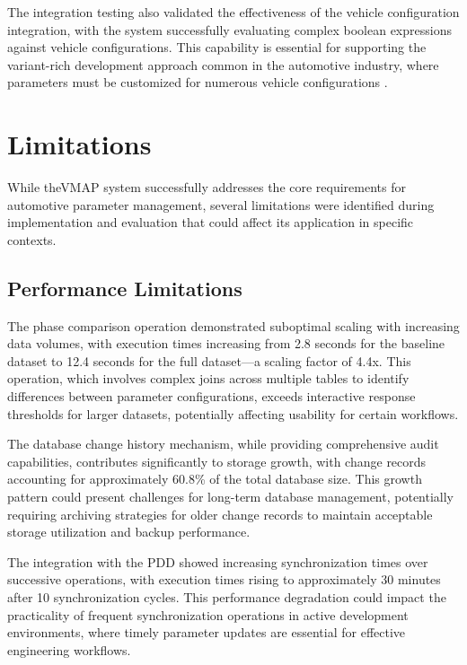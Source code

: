 The integration testing also validated the effectiveness of the vehicle configuration integration, with the system successfully evaluating complex boolean expressions against vehicle configurations. This capability is essential for supporting the variant-rich development approach common in the automotive industry, where parameters must be customized for numerous vehicle configurations \cite{staron2021autosar}.

\section{Limitations}
\label{sec:limitations}

While the\ac{VMAP} system successfully addresses the core requirements for automotive parameter management, several limitations were identified during implementation and evaluation that could affect its application in specific contexts.

\subsection{Performance Limitations}
\label{subsec:performance-limitations}

The phase comparison operation demonstrated suboptimal scaling with increasing data volumes, with execution times increasing from 2.8 seconds for the baseline dataset to 12.4 seconds for the full dataset—a scaling factor of 4.4x. This operation, which involves complex joins across multiple tables to identify differences between parameter configurations, exceeds interactive response thresholds for larger datasets, potentially affecting usability for certain workflows.

The database change history mechanism, while providing comprehensive audit capabilities, contributes significantly to storage growth, with change records accounting for approximately 60.8\% of the total database size. This growth pattern could present challenges for long-term database management, potentially requiring archiving strategies for older change records to maintain acceptable storage utilization and backup performance.

The integration with the \ac{PDD} showed increasing synchronization times over successive operations, with execution times rising to approximately 30 minutes after 10 synchronization cycles. This performance degradation could impact the practicality of frequent synchronization operations in active development environments, where timely parameter updates are essential for effective engineering workflows.

